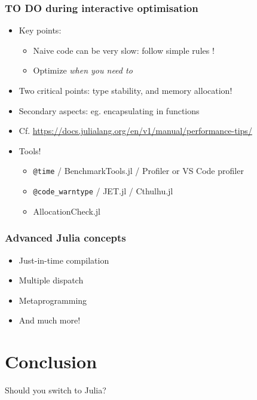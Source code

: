 \documentclass{beamer}
\begin{document}
\begin{frame}
    \frametitle{TO DO during interactive optimisation}
    \begin{itemize}
        \item Key points:
        \begin{itemize}
            \item Naive code can be very slow: follow simple rules !
            \item Optimize \textit{when you need to}
        \end{itemize}
        \pause
        \item Two critical points: type stability, and memory allocation!
        \item Secondary aspects: eg. encapsulating in functions
        \pause
        \item Cf. \footnotesize{\url{https://docs.julialang.org/en/v1/manual/performance-tips/}}
        \pause
        \item Tools!
        \begin{itemize}
            \item \texttt{@time} / BenchmarkTools.jl / Profiler or VS Code profiler
            \item \texttt{@code\_warntype} / JET.jl / Cthulhu.jl
            \item AllocationCheck.jl
        \end{itemize}
    \end{itemize}
\end{frame}

\begin{frame}
    \frametitle{Advanced Julia concepts}
    \begin{itemize}
        \item Just-in-time compilation
        \item Multiple dispatch
        \item Metaprogramming
        \item And much more!
    \end{itemize}
\end{frame}


\section{Conclusion}

\begin{frame}
    Should you switch to Julia?
\end{frame}
\end{document}
